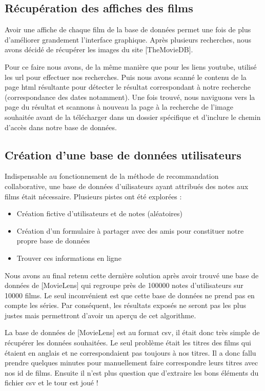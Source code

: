 \subsection{Récupération des affiches des films}
Avoir une affiche de chaque film de la base de données permet une fois de plus d'améliorer grandement l'interface graphique.
Après plusieurs recherches, nous avons décidé de récupérer les images du site \href{https://www.themoviedb.org}[TheMovieDB].\par
Pour ce faire nous avons, de la même manière que pour les liens youtube, utilisé les url pour effectuer nos recherches. Puis nous avons scanné le contenu de la page html résultante pour détecter le résultat correspondant à notre recherche (correspondance des dates notamment). Une fois trouvé, nous naviguons vers la page du résultat et scannons à nouveau la page à la recherche de l'image souhaitée avant de la télécharger dans un dossier spécifique et d'inclure le chemin d'accès dans notre base de données.

\subsection{Création d'une base de données utilisateurs}
Indispensable au fonctionnement de la méthode de recommandation collaborative, une base de données d'uilisateurs ayant attribués des notes aux films était nécessaire. Plusieurs pistes ont été explorées :
\begin{itemize}
	\item Création fictive d'utilisateurs et de notes (aléatoires)
	\item Création d'un formulaire à partager avec des amis pour constituer notre propre base de données
	\item Trouver ces informations en ligne
\end{itemize}
Nous avons au final retenu cette dernière solution après avoir trouvé une base de données de \href{https://grouplens.org/datasets/movielens/}[MovieLens] qui regroupe près de 100000 notes d'utilisateurs sur 10000 films. Le seul inconvénient est que cette base de données ne prend pas en compte les séries. Par conséquent, les résultats exposés ne seront pas les plus justes mais permettront d'avoir un aperçu de cet algorithme.\par
La base de données de \href{https://grouplens.org/datasets/movielens/}[MovieLens] est au format csv, il était donc très simple de récupérer les données souhaitées. Le seul problème était les titres des films qui étaient en anglais et ne correspondaient pas toujours à nos titres. Il a donc fallu prendre quelques minutes pour manuellement faire correspondre leurs titres avec nos id de films. Ensuite il n'est plus question que d'extraire les bons éléments du fichier csv et le tour est joué !
